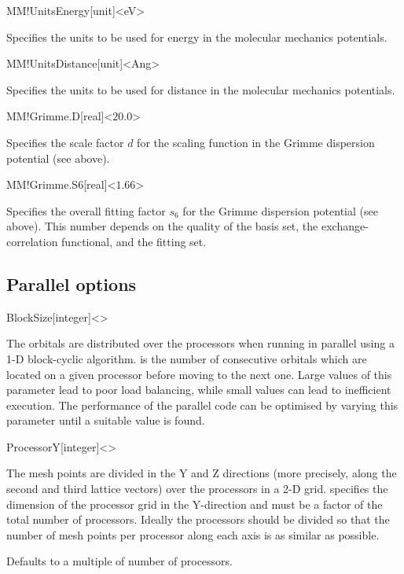 \begin{fdfentry}{MM!UnitsEnergy}[unit]<eV>

  Specifies the units to be used for energy in the
  molecular mechanics potentials.
  
\end{fdfentry}

\begin{fdfentry}{MM!UnitsDistance}[unit]<Ang>
  
  Specifies the units to be used for distance in the
  molecular mechanics potentials.

\end{fdfentry}

\begin{fdfentry}{MM!Grimme.D}[real]<$20.0$>

  Specifies the scale factor $d$ for the scaling function
  in the Grimme dispersion potential (see above).

\end{fdfentry}

\begin{fdfentry}{MM!Grimme.S6}[real]<$1.66$>

  Specifies the overall fitting factor $s_6$ for the
  Grimme dispersion potential (see above). This number depends on the
  quality of the basis set, the exchange-correlation functional, and the
  fitting set.
  
\end{fdfentry}


\subsection{Parallel options}


\begin{fdfentry}{BlockSize}[integer]<>

  The orbitals are distributed over the processors when running in
  parallel using a 1-D block-cyclic algorithm.  is
  the number of consecutive orbitals which are located on a given
  processor before moving to the next one. Large values of this
  parameter lead to poor load balancing, while small values can lead
  to inefficient execution.  The performance of the parallel code can
  be optimised by varying this parameter until a suitable value is
  found.

\end{fdfentry}

\begin{fdfentry}{ProcessorY}[integer]<>
  
  The mesh points are divided in the Y and Z directions (more
  precisely, along the second and third lattice vectors) over the
  processors in a 2-D grid.  specifies the
  dimension of the processor grid in the Y-direction and must be a
  factor of the total number of processors. Ideally the processors
  should be divided so that the number of mesh points per processor
  along each axis is as similar as possible.

  Defaults to a multiple of number of processors.

\end{fdfentry}


